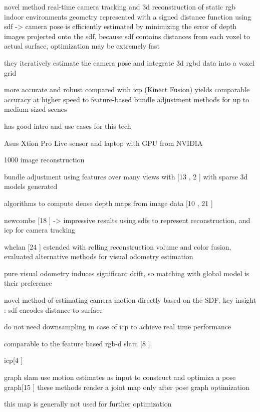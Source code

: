 novel method
real-time camera tracking and 3d reconstruction
of static rgb indoor environments
geometry represented with a signed distance function
using sdf -> camera pose is efficiently estimated by minimizing the error of depth images projected onto the sdf, because sdf contains distances from each voxel to actual surface, optimization may be extremely fast

they iteratively estimate the camera pose and integrate 3d rgbd data into a voxel grid

more accurate and robust compared with icp (Kinect Fusion)
yields comparable accuracy at higher speed to feature-based bundle adjustment methods for up to medium sized scenes

has good intro and use cases for this tech

Asus Xtion Pro Live sensor and laptop with GPU from NVIDIA

1000 image reconstruction

bundle adjustment using features over many views with [13 \cite{Klein07Parallel} , 2 \cite{Agarwal09Building}] with sparse 3d models generated

algorithms to compute dense depth maps from image data [10 \cite{Hirschmuller05Accurate} , 21 \cite{Stuhmer10Real}]

newcombe [18 \cite{Newcombe11Kinectfusion} ] -> impressive results using sdfs to represent reconstruction, and icp for camera tracking

whelan [24 \cite{Whelan13Robust}] estended with rolling reconstruction volume and color fusion, evaluated alternative methods for visual odometry estimation

pure visual odometry induces significant drift, so matching with global model is their preference

novel method of estimating camera motion directly based on the SDF, key insight : sdf encodes distance to surface

do not need downsampling in case of icp to achieve real time performance

comparable to the feature based rgb-d slam [8 \cite{Endres12Evaluation}]

icp[4 \cite{Besl92Method}]

graph slam use motion estimates as input to construct and optimiza a pose graph[15 \cite{Kummerle11G}] these methods render a joint map only after pose graph optimization

this map is generally not used for further optimization

